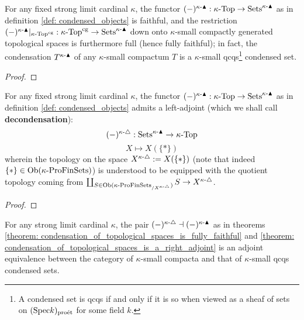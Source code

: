             \begin{theorem} \label{theorem: condensation_of_topological_spaces_is_fully_faithful}
                For any fixed strong limit cardinal $\kappa$, the functor $(-)^{\kappa\text{-}\blacktriangle}: \kappa\text{-}\mathrm{Top} \to \mathrm{Sets}^{\kappa\text{-}\blacktriangle}$ as in definition \ref{def: condensed_objects} is faithful, and the restriction $(-)^{\kappa\text{-}\blacktriangle}|_{\kappa\text{-}\mathrm{Top}^{\mathrm{cg}}}: \kappa\text{-}\mathrm{Top}^{\mathrm{cg}} \to \mathrm{Sets}^{\kappa\text{-}\blacktriangle}$ down onto $\kappa$-small compactly generated topological spaces is furthermore full (hence fully faithful); in fact, the condensation $T^{\kappa\text{-}\blacktriangle}$ of any $\kappa$-small compactum $T$ is a $\kappa$-small qcqs\footnote{A condensed set is qcqs if and only if it is so when viewed as a sheaf of sets on $(\mathrm{Spec} k)_{\mathrm{pro\acute{e}t}}$ for some field $k$.} condensed set.
            \end{theorem}
                \begin{proof}
                    
                \end{proof}
            \begin{theorem} \label{theorem: condensation_of_topological_spaces_is_a_right_adjoint}
                For any fixed strong limit cardinal $\kappa$, the functor $(-)^{\kappa\text{-}\blacktriangle}: \kappa\text{-}\mathrm{Top} \to \mathrm{Sets}^{\kappa\text{-}\blacktriangle}$ as in definition \ref{def: condensed_objects} admits a left-adjoint (which we shall call \textbf{decondensation}):
                    $$(-)^{\kappa\text{-}\triangle}: \mathrm{Sets}^{\kappa\text{-}\blacktriangle} \to \kappa\text{-}\mathrm{Top}$$
                    $$X \mapsto X(\{*\})$$
                wherein the topology on the space $X^{\kappa\text{-}\triangle} := X(\{*\})$ (note that indeed $\{*\} \in \mathrm{Ob}(\kappa\text{-}\mathrm{Pro}\mathrm{Fin}\mathrm{Sets})$) is understood to be equipped with the quotient topology coming from $\coprod_{S \in \mathrm{Ob}(\kappa\text{-}\mathrm{Pro}\mathrm{Fin}\mathrm{Sets}_{/X^{\kappa\text{-}\triangle}})} S \to X^{\kappa\text{-}\triangle}$.
            \end{theorem}
                \begin{proof}
                    
                \end{proof}
            \begin{corollary}
                For any strong limit cardinal $\kappa$, the pair $(-)^{\kappa\text{-}\triangle} \dashv (-)^{\kappa\text{-}\blacktriangle}$ as in theorems \ref{theorem: condensation_of_topological_spaces_is_fully_faithful} and \ref{theorem: condensation_of_topological_spaces_is_a_right_adjoint} is an adjoint equivalence between the category of $\kappa$-small compacta and that of $\kappa$-small qcqs condensed sets.  
            \end{corollary}
            

